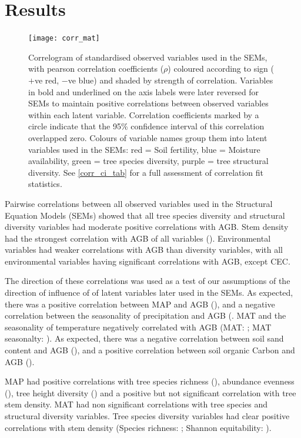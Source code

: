 \documentclass[11pt,a4paper]{article}
\begin{document}
\section{Results}

\begin{figure}[H]
\centering
	\texttt{[image: corr\_mat]}
	\caption{Correlogram of standardised observed variables used in the SEMs, with pearson correlation coefficients ($\rho$) coloured according to sign ($+$ve red, $-$ve blue) and shaded by strength of correlation. Variables in bold and underlined on the axis labels were later reversed for SEMs to maintain positive correlations between observed variables within each latent variable. Correlation coefficients marked by a circle indicate that the 95\% confidence interval of this correlation overlapped zero. Colours of variable names group them into latent variables used in the SEMs: red = Soil fertility, blue = Moisture availability, green = tree species diversity, purple = tree structural diversity. See \autoref{corr_ci_tab} for a full assessment of correlation fit statistics.}
	\label{corr_mat}
\end{figure}

Pairwise correlations between all observed variables used in the Structural Equation Models (SEMs) showed that all tree species diversity and structural diversity variables had moderate positive correlations with AGB. Stem density had the strongest correlation with AGB of all variables (\ccib{}). Environmental variables had weaker correlations with AGB than diversity variables, with all environmental variables having significant correlations with AGB, except CEC.

The direction of these correlations was used as a test of our assumptions of the direction of influence of of latent variables later used in the SEMs. As expected, there was a positive correlation between MAP and AGB (\ccmb{}), and a negative correlation between the seasonality of precipitation and AGB (\ccmcb{}. MAT and the seasonality of temperature negatively correlated with AGB (MAT: \cctb{}; MAT seasonalty: \cctcb{}). As expected, there was a negative correlation between soil sand content and AGB (\ccsb{}), and a positive correlation between soil organic Carbon and AGB (\ccob{}).

MAP had positive correlations with tree species richness (\ccms{}), abundance evenness (\ccme{}), tree height diversity (\ccmh{}) and a positive but not significant correlation with tree stem density. MAT had non significant correlations with tree species and structural diversity variables. Tree species diversity variables had clear positive correlations with stem density (Species richness: \ccsi{}; Shannon equitability: \ccei{}). 
\end{document}
